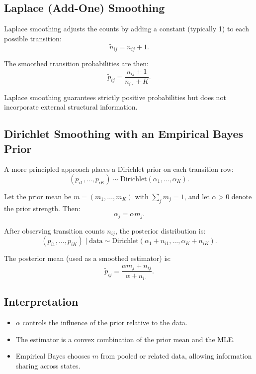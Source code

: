 \documentclass[11pt]{article}
\begin{document}
\subsection*{Laplace (Add-One) Smoothing}

Laplace smoothing adjusts the counts by adding a constant (typically 1) to each possible transition:
\[
\tilde n_{ij} = n_{ij} + 1.
\]

The smoothed transition probabilities are then:
\[
\tilde p_{ij}
=
\frac{n_{ij} + 1}{n_{i\cdot} + K}.
\]

Laplace smoothing guarantees strictly positive probabilities but does not incorporate external structural information.

\subsection*{Dirichlet Smoothing with an Empirical Bayes Prior}

A more principled approach places a Dirichlet prior on each transition row:
\[
(p_{i1},\dots,p_{iK}) \sim \text{Dirichlet}(\alpha_1,\dots,\alpha_K).
\]

Let the prior mean be \(m = (m_1,\dots,m_K)\) with \(\sum_j m_j = 1\), and let \(\alpha > 0\) denote the prior strength.
Then:
\[
\alpha_j = \alpha m_j.
\]

After observing transition counts \(n_{ij}\), the posterior distribution is:
\[
(p_{i1},\dots,p_{iK}) \mid \text{data}
\sim
\text{Dirichlet}(\alpha_1 + n_{i1},\dots,\alpha_K + n_{iK}).
\]

The posterior mean (used as a smoothed estimator) is:
\[
\tilde p_{ij}
=
\frac{\alpha m_j + n_{ij}}{\alpha + n_{i\cdot}}.
\]

\subsection*{Interpretation}

\begin{itemize}
  \item \(\alpha\) controls the influence of the prior relative to the data.
  \item The estimator is a convex combination of the prior mean and the MLE.
  \item Empirical Bayes chooses \(m\) from pooled or related data, allowing information sharing across states.
\end{itemize}
\end{document}
